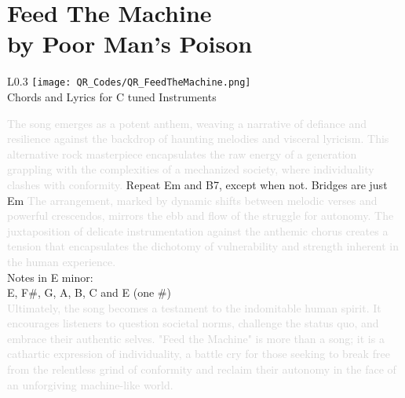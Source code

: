 \chapter[Feed The Machine]{Feed The Machine\\[1ex]\large{by Poor Man's Poison}}

\begin{wrapfigure}{L}{0.3\textwidth}
\texttt{[image: QR\_Codes/QR\_FeedTheMachine.png]}\\
Chords and Lyrics for C tuned Instruments
\end{wrapfigure}

\textcolor{lightgray}{The song  emerges as a potent anthem, weaving a narrative of defiance and resilience against the backdrop of haunting melodies and visceral lyricism. This alternative rock masterpiece encapsulates the raw energy of a generation grappling with the complexities of a mechanized society, where individuality clashes with conformity.} Repeat Em and B7, except when not. Bridges are just Em
\textcolor{lightgray}{The arrangement, marked by dynamic shifts between melodic verses and powerful crescendos, mirrors the ebb and flow of the struggle for autonomy. The juxtaposition of delicate instrumentation against the anthemic chorus creates a tension that encapsulates the dichotomy of vulnerability and strength inherent in the human experience.}\\

Notes in E minor:\\

E, F\#, G, A, B, C and E (one \#)\\

\textcolor{lightgray}{Ultimately, the song becomes a testament to the indomitable human spirit. It encourages listeners to question societal norms, challenge the status quo, and embrace their authentic selves. "Feed the Machine" is more than a song; it is a cathartic expression of individuality, a battle cry for those seeking to break free from the relentless grind of conformity and reclaim their autonomy in the face of an unforgiving machine-like world.}
